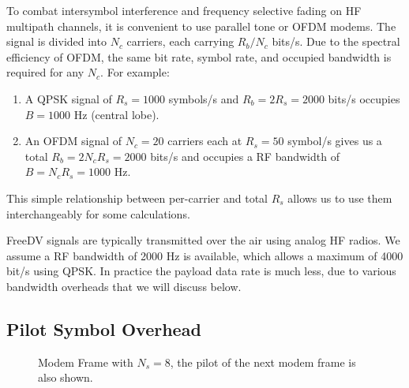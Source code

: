 \documentclass{article}
\begin{document}
To combat intersymbol interference and frequency selective fading on HF multipath channels, it is convenient to use parallel tone or OFDM modems. The signal is divided into $N_c$ carriers, each carrying $R_b/N_c$ bits/s.  Due to the spectral efficiency of OFDM, the same bit rate, symbol rate, and occupied bandwidth is required for any $N_c$.  For example:
\begin{enumerate}
\item A QPSK signal of $R_s=1000$ symbols/s and $R_b=2R_s=2000$ bits/s occupies $B=1000$ Hz (central lobe).
\item An OFDM signal of $N_c=20$ carriers each at $R_s=50$ symbol/s gives us a total $R_b=2N_cR_s=2000$ bits/s and occupies a RF bandwidth of $B=N_cR_s=1000$ Hz.
\end{enumerate}
This simple relationship between per-carrier and total $R_s$ allows us to use them interchangeably for some calculations.
 
FreeDV signals are typically transmitted over the air using analog HF radios.  We assume a RF bandwidth of 2000 Hz is available, which allows a maximum of 4000 bit/s using QPSK.  In practice the payload data rate is much less, due to various bandwidth overheads that we will discuss below.

\subsection{Pilot Symbol Overhead}

\begin{figure}[h]
\caption{Modem Frame with $N_s=8$, the pilot of the next modem frame is also shown.}
\vspace{5mm}
\label{fig:modem_frame}
\centering
{}
\end{figure}
\end{document}
